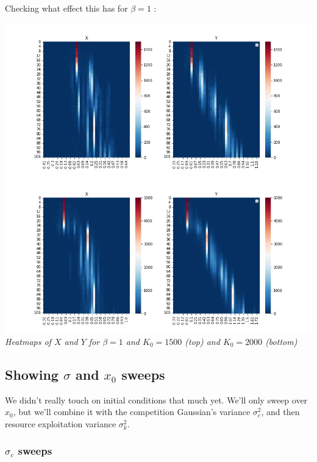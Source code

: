 \documentclass{article}
\begin{document}
Checking what effect this has for $\beta = 1$ : \\

\begin{center}
\includegraphics[scale=0.37]{beta=1k0=1500} 
\includegraphics[scale=0.37]{beta=1k0=5000} \\
\textit{Heatmaps of $X$ and $Y$ for $\beta = 1$ and $K_0 = 1500$ (top) and $K_0 = 2000$ (bottom)}
\end{center}


\subsection{Showing $\sigma$ and $x_0$ sweeps}

We didn't really touch on initial conditions that much yet. We'll only sweep over $x_0$, but we'll combine it with the competition Gaussian's variance $\sigma_c^2$, and then resource exploitation variance $\sigma_k^2$. \\
\vspace{5mm}

\subsubsection{$\sigma_c$ sweeps}
\end{document}
